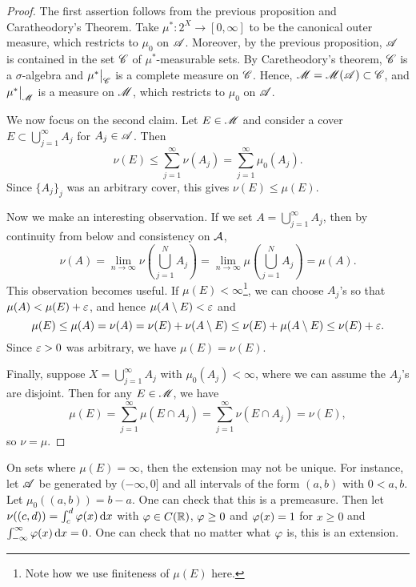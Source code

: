 \documentclass[12pt]{article} %
\begin{document}
\begin{proof}
    The first assertion follows from the previous proposition and Caratheodory's Theorem. Take $\mu^* : 2^X \to [0, \infty]$ to be the canonical outer measure, which restricts to $\mu_0$ on $\mathscr{A}$. Moreover, by the previous proposition, $\mathscr{A}$ is contained in the set $\mathscr{C}$ of $\mu^*$-measurable sets. By Caretheodory's theorem, $\mathscr{C}$ is a $\sigma$-algebra and $\restr{\mu^*}{\SC}$ is a complete measure on $\mathscr{C}$. Hence, $\mathscr{M} = \mathscr{M}(\mathscr{A}) \subset \mathscr{C}$, and $\restr{\mu^*}{\SM}$ is a measure on $\mathscr{M}$, which restricts to $\mu_0$ on $\mathscr{A}$.
    
    We now focus on the second claim. Let $E \in \mathscr{M}$ and consider a cover $E \subset \bigcup_{j=1}^{\infty} A_j$ for $A_j \in \mathscr{A}$. Then \[\nu(E) \leq \sum_{j=1}^{\infty} \nu(A_j) = \sum_{j=1}^{\infty} \mu_0(A_j).\] Since $\{A_j\}_j$ was an arbitrary cover, this gives $\nu(E) \leq \mu(E)$. 
    
    Now we make an interesting observation. If we set $A = \bigcup_{j=1}^{\infty} A_j$, then by continuity from below and consistency on $\mathcal{A}$, \[\nu(A) = \lim_{n\to \infty} \nu\left(\bigcup_{j=1}^{N} A_j\right) = \lim_{n \to \infty} \mu\left(\bigcup_{j=1}^{N} A_j \right) = \mu(A).\] This observation becomes useful. If $\mu(E) < \infty$\footnote{Note how we use finiteness of $\mu(E)$ here.}, we can choose $A_j$'s so that $\mu(A) < \mu(E) + \varepsilon$, and hence $\mu(A \setminus E) < \varepsilon$ and \[\mu(E) \leq \mu(A) = \nu(A) = \nu(E) + \nu(A \setminus E) \leq \nu(E) + \mu(A \setminus E) \leq \nu(E) + \varepsilon.\] Since $\varepsilon > 0$ was arbitrary, we have $\mu(E) = \nu(E)$.

    Finally, suppose $X = \bigcup_{j=1}^{\infty} A_j$ with $\mu_0(A_j) < \infty$, where we can assume the $A_j$'s are disjoint. Then for any $E \in \mathscr{M}$, we have \[\mu(E) = \sum_{j=1}^{\infty} \mu(E \cap A_j) = \sum_{j=1}^{\infty} \nu(E \cap A_j) = \nu(E),\] so $\nu = \mu$.
\end{proof}

\begin{remark}
    On sets where $\mu(E) = \infty$, then the extension may not be unique. For instance, let $\mathscr{A}$ be generated by $(-\infty, 0]$ and all intervals of the form $(a, b)$ with $0 < a, b$. Let $\mu_0((a, b)) = b-a$. One can check that this is a premeasure. Then let $\nu((c, d)) = \int_c^d \varphi(x) \, \mathrm{d} x$ with $\varphi \in C(\mathbb{R})$, $\varphi\geq 0$ and $\varphi(x) = 1$ for $x \geq 0$ and $\int_{-\infty}^{\infty} \varphi(x) \, \mathrm{d} x = 0$. One can check that no matter what $\varphi$ is, this is an extension. 
\end{remark}
\end{document}
